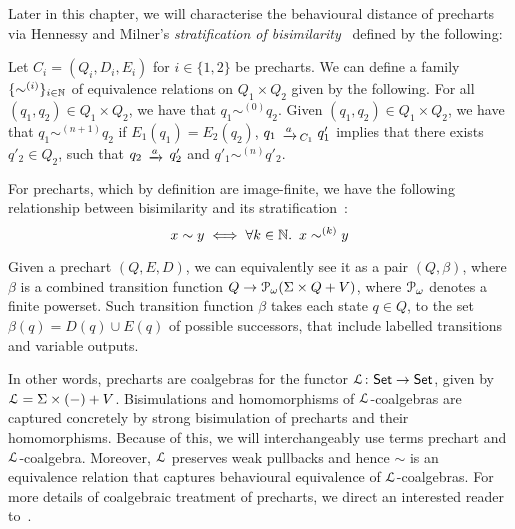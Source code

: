 Later in this chapter, we will characterise the behavioural distance of precharts via Hennessy and Milner's \emph{stratification of bisimilarity}~\cite{hennessy:1985:algebraic} defined by the following:
	\begin{definition}
	Let $C_i = (Q_i, D_i, E_i)$ for $i \in \{1,2\}$ be precharts. We can define a family $\{\sim^{(i)} \}_{i \in \mathbb{N}}$ of equivalence relations on $Q_1 \times Q_2$ given by the following. For all $(q_1,q_2) \in Q_1 \times Q_2$, we have that $q_1 \sim^{(0)} q_2$. Given $(q_1, q_2) \in Q_1 \times Q_2$, we have that $q_1 \sim ^{(n+1)} q_2$ if  $E_1(q_1) = E_2(q_2)$,  $q_1 \tr{a}_{C_1} q'_1$ implies that there exists $q'_2 \in Q_2$, such that $q_2 \tr{a} q'_2$ and $q'_1 \sim^{(n)} q'_2$.
\end{definition}

For precharts, which by definition are image-finite, we have the following relationship between bisimilarity and its stratification~\cite{hennessy:1985:algebraic}:
\begin{equation}\label{eqn:stratification}
	x \sim y \iff \forall k \in \mathbb{N} \ldotp~x\sim^{(k)} y
\end{equation}

Given a prechart $(Q, E, D)$, we can equivalently see it as a pair $(Q, \beta)$, where $\beta$ is a combined transition function $Q \to \mathcal{P}_\omega (\Sigma \times Q + V)$, where $\mathcal{P}_\omega$ denotes a finite powerset. Such transition function $\beta$ takes each state $q \in Q$, to the set $\beta(q) = D(q) \cup E(q)$ of possible successors, that include labelled transitions and variable outputs.

In other words, precharts are coalgebras for the functor $\mathcal{L} \colon {\mathsf{Set}} \to {\mathsf{Set}}$, given by $\mathcal{L} = \Sigma \times (-) + V$. Bisimulations and homomorphisms of $\mathcal{L}$-coalgebras are captured concretely by strong bisimulation of precharts and their homomorphisms. Because of this, we will interchangeably use terms prechart and $\mathcal{L}$-coalgebra. Moreover, $\mathcal{L}$ preserves weak pullbacks and hence $\sim$ is an equivalence relation that captures behavioural equivalence of $\mathcal{L}$-coalgebras. For more details of coalgebraic treatment of precharts, we direct an interested reader to~\cite{Schmid:2021:Star}.
